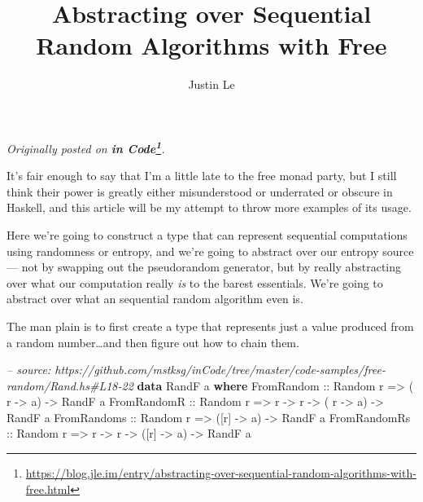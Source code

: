 \documentclass[]{article}
\title{Abstracting over Sequential Random Algorithms with Free}
\author{Justin Le}
\newenvironment{Shaded}{\begin{snugshade}}{\end{snugshade}}
\newcommand{\CommentTok}[1]{\textcolor[rgb]{0.56,0.35,0.01}{\textit{#1}}}
\newcommand{\DataTypeTok}[1]{\textcolor[rgb]{0.13,0.29,0.53}{#1}}
\newcommand{\KeywordTok}[1]{\textcolor[rgb]{0.13,0.29,0.53}{\textbf{#1}}}
\newcommand{\NormalTok}[1]{#1}
\newcommand{\OtherTok}[1]{\textcolor[rgb]{0.56,0.35,0.01}{#1}}
\renewcommand{\href}[2]{#2\footnote{\url{#1}}}
\begin{document}
\maketitle

\emph{Originally posted on
\textbf{\href{https://blog.jle.im/entry/abstracting-over-sequential-random-algorithms-with-free.html}{in
Code}}.}

It's fair enough to say that I'm a little late to the free monad party, but I
still think their power is greatly either misunderstood or underrated or obscure
in Haskell, and this article will be my attempt to throw more examples of its
usage.

Here we're going to construct a type that can represent sequential computations
using randomness or entropy, and we're going to abstract over our entropy source
--- not by swapping out the pseudorandom generator, but by really abstracting
over what our computation really \emph{is} to the barest essentials. We're going
to abstract over what an sequential random algorithm even is.

The man plain is to first create a type that represents just a value produced
from a random number\ldots{}and then figure out how to chain them.

\begin{Shaded}
\begin{Highlighting}[]
\CommentTok{-- source: https://github.com/mstksg/inCode/tree/master/code-samples/free-random/Rand.hs#L18-22}
\KeywordTok{data} \DataTypeTok{RandF}\NormalTok{ a }\KeywordTok{where}
    \DataTypeTok{FromRandom}\OtherTok{   ::} \DataTypeTok{Random}\NormalTok{ r }\OtherTok{=>}\NormalTok{           ( r  }\OtherTok{->}\NormalTok{ a) }\OtherTok{->} \DataTypeTok{RandF}\NormalTok{ a}
    \DataTypeTok{FromRandomR}\OtherTok{  ::} \DataTypeTok{Random}\NormalTok{ r }\OtherTok{=>}\NormalTok{ r }\OtherTok{->}\NormalTok{ r }\OtherTok{->}\NormalTok{ ( r  }\OtherTok{->}\NormalTok{ a) }\OtherTok{->} \DataTypeTok{RandF}\NormalTok{ a}
    \DataTypeTok{FromRandoms}\OtherTok{  ::} \DataTypeTok{Random}\NormalTok{ r }\OtherTok{=>}\NormalTok{           ([r] }\OtherTok{->}\NormalTok{ a) }\OtherTok{->} \DataTypeTok{RandF}\NormalTok{ a}
    \DataTypeTok{FromRandomRs}\OtherTok{ ::} \DataTypeTok{Random}\NormalTok{ r }\OtherTok{=>}\NormalTok{ r }\OtherTok{->}\NormalTok{ r }\OtherTok{->}\NormalTok{ ([r] }\OtherTok{->}\NormalTok{ a) }\OtherTok{->} \DataTypeTok{RandF}\NormalTok{ a}
\end{Highlighting}
\end{Shaded}
\end{document}
